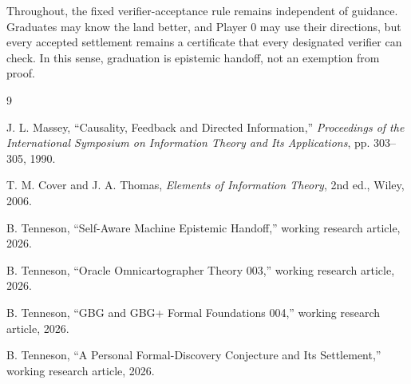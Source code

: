 \documentclass[11pt]{article}
\theoremstyle{definition}
\begin{document}
Throughout, the fixed verifier-acceptance rule remains independent of guidance.  Graduates may know the land better, and Player 0 may use their directions, but every accepted settlement remains a certificate that every designated verifier can check.  In this sense, graduation is epistemic handoff, not an exemption from proof.

\begin{thebibliography}{9}

J. L. Massey,
``Causality, Feedback and Directed Information,''
\emph{Proceedings of the International Symposium on Information Theory and Its Applications},
pp. 303--305, 1990.

T. M. Cover and J. A. Thomas,
\emph{Elements of Information Theory}, 2nd ed.,
Wiley, 2006.

B. Tenneson,
``Self-Aware Machine Epistemic Handoff,''
working research article, 2026.

B. Tenneson,
``Oracle Omnicartographer Theory 003,''
working research article, 2026.

B. Tenneson,
``GBG and GBG+ Formal Foundations 004,''
working research article, 2026.

B. Tenneson,
``A Personal Formal-Discovery Conjecture and Its Settlement,''
working research article, 2026.

\end{thebibliography}
\end{document}
